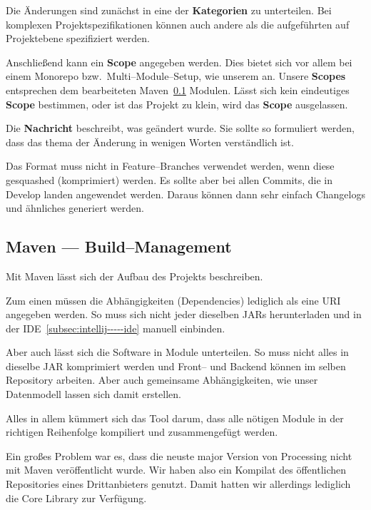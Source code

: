         Die Änderungen sind zunächst in eine der \textbf{Kategorien} zu unterteilen.
        Bei komplexen Projektspezifikationen können auch andere als die aufgeführten auf Projektebene spezifiziert werden.


        Anschließend kann ein \textbf{Scope} angegeben werden.
        Dies bietet sich vor allem bei einem Monorepo bzw.\ Multi--Module--Setup, wie unserem an.
        Unsere \textbf{Scopes} entsprechen dem bearbeiteten Maven~\ref{subsec:maven-----build--management} Modulen.
        Lässt sich kein eindeutiges \textbf{Scope} bestimmen, oder ist das Projekt zu klein, wird das \textbf{Scope} ausgelassen.


        Die \textbf{Nachricht} beschreibt, was geändert wurde.
        Sie sollte so formuliert werden, dass das thema der Änderung in wenigen Worten verständlich ist.


        Das Format muss nicht in Feature--Branches verwendet werden, wenn diese gesquashed (komprimiert) werden.
        Es sollte aber bei allen Commits, die in Develop landen angewendet werden.
        Daraus können dann sehr einfach Changelogs und ähnliches generiert werden.


\subsection{Maven --- Build--Management}\label{subsec:maven-----build--management}
    Mit Maven lässt sich der Aufbau des Projekts beschreiben.


    Zum einen müssen die Abhängigkeiten (Dependencies) lediglich als eine URI angegeben werden.
    So muss sich nicht jeder dieselben JARs herunterladen und in der IDE~\ref{subsec:intellij-----ide} manuell einbinden.


    Aber auch lässt sich die Software in Module unterteilen.
    So muss nicht alles in dieselbe JAR komprimiert werden und Front-- und Backend können im selben Repository arbeiten.
    Aber auch gemeinsame Abhängigkeiten, wie unser Datenmodell lassen sich damit erstellen.


    Alles in allem kümmert sich das Tool darum, dass alle nötigen Module in der richtigen Reihenfolge kompiliert und zusammengefügt werden.


    Ein großes Problem war es, dass die neuste major Version von Processing nicht mit Maven veröffentlicht wurde.
    Wir haben also ein Kompilat des öffentlichen Repositories eines Drittanbieters genutzt.
    Damit hatten wir allerdings lediglich die Core Library zur Verfügung.


